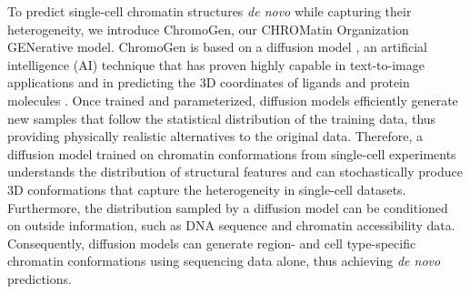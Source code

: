 \documentclass[12pt,letterpaper]{article}
\begin{document}
To predict single-cell chromatin structures \emph{de novo} while capturing their heterogeneity, we introduce ChromoGen, our CHROMatin Organization GENerative model. ChromoGen is based on a diffusion model \cite{Sohl-Dickstein2015,song2021ScoreBased,Ho2020}, an artificial intelligence (AI) technique that has proven highly capable in text-to-image applications \cite{Dhariwal2021,Saharia2022,rombach_high-resolution_2022} and in predicting the 3D coordinates of ligands \cite{jing2023Torsional} and protein molecules \cite{arts2023Two,ingraham2023Illuminating,watson2023Novo}. Once trained and parameterized, diffusion models efficiently generate new samples that follow the statistical distribution of the training data, %
thus providing physically realistic alternatives to the original data. 
Therefore, a diffusion model trained on chromatin conformations from single-cell experiments understands the distribution of structural features and can stochastically produce 3D conformations that capture the heterogeneity in single-cell datasets. 
Furthermore, the distribution sampled by a diffusion model can be conditioned on outside information, such as DNA sequence and chromatin accessibility data. 
Consequently, diffusion models can generate region- and cell type-specific chromatin conformations using sequencing data alone, thus achieving \emph{de novo} predictions. 
\end{document}
